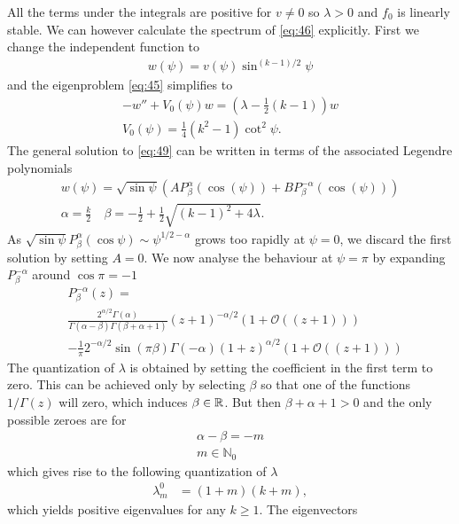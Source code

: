 All the terms under the integrals are positive for $v\ne0$ so
$\lambda>0$ and $f_0$ is linearly stable. We can however calculate the
spectrum of \eqref{eq:46} explicitly. First we change the independent
function to
\begin{align}
  \label{eq:48}
  w(\psi)= v(\psi)\sin^{(k-1)/2}\psi
\end{align}
and the eigenproblem \eqref{eq:45} simplifies to
\begin{align}
  \label{eq:49}
  -w''+V_0(\psi)w=\left(\lambda-\frac{1}{2}(k-1)\right)w\\
  V_0(\psi)=\frac{1}{4}(k^2-1)\cot^2\psi.
\end{align}
The general solution to \eqref{eq:49} can be written in terms of the
associated Legendre polynomials
\begin{align}
  \label{eq:50}
  w(\psi)=\sqrt{\sin\psi}\left(
    AP^\alpha_{\beta}(\cos(\psi))+BP^{-\alpha}_{\beta}(\cos(\psi))
  \right)\\
  \label{eq:51}
  \alpha=\frac{k}{2}\quad \beta=-\frac{1}{2}+\frac{1}{2}\sqrt{(k-1)^2+4\lambda}.
\end{align}
As $\sqrt{\sin\psi}P_\beta^{\alpha}(\cos\psi)\sim\psi^{1/2-\alpha}$
grows too rapidly at $\psi=0$, we discard the first solution by
setting $A=0$. We now analyse the behaviour at $\psi=\pi$ by expanding
$P_\beta^{-\alpha}$ around $\cos\pi=-1$
\begin{align}
  \label{eq:52}
  &P_\beta^{-\alpha}(z)=\\
  &\frac{2^{\alpha/2}\Gamma(\alpha)}{\Gamma(\alpha-\beta)\Gamma(\beta+\alpha+1)}
  (z+1)^{-\alpha/2}(1+\mathcal{O}((z+1)))\\
  &-\frac{1}{\pi}2^{-\alpha/2}\sin(\pi\beta)\Gamma(-\alpha)
  (1+z)^{\alpha/2}(1+\mathcal{O}((z+1)))
\end{align}
The quantization of $\lambda$ is obtained by setting the coefficient
in the first term to zero. This can be achieved only by selecting
$\beta$ so that one of the functions $1/\Gamma(z)$ will zero, which
induces $\beta\in\mathbb{R}$. But then $\beta+\alpha+1>0$ and the only
possible zeroes are for
\begin{align}
  \label{eq:53}
  \alpha-\beta=-m\\
  m\in\mathbb{N}_0
\end{align}
which gives rise to the following quantization of $\lambda$
\begin{align}
  \label{eq:54}
  \lambda_m^0&=(1+m)(k+m),
\end{align}
which yields positive eigenvalues for any $k\ge1$. The eigenvectors
